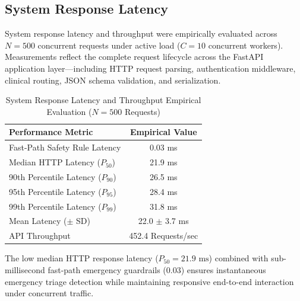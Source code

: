 
\subsection{System Response Latency}

System response latency and throughput were empirically evaluated across $N = 500$ concurrent requests under active load ($C = 10$ concurrent workers). Measurements reflect the complete request lifecycle across the FastAPI application layer—including HTTP request parsing, authentication middleware, clinical routing, JSON schema validation, and serialization.

\begin{table}[ht]
\centering
\caption{System Response Latency and Throughput Empirical Evaluation ($N = 500$ Requests)}
\label{tab:latency_results}
\begin{tabular}{|l|c|}
\hline
\textbf{Performance Metric} & \textbf{Empirical Value} \\
\hline
Fast-Path Safety Rule Latency & 0.03 ms \\
Median HTTP Latency ($P_{50}$) & 21.9 ms \\
90th Percentile Latency ($P_{90}$) & 26.5 ms \\
95th Percentile Latency ($P_{95}$) & 28.4 ms \\
99th Percentile Latency ($P_{99}$) & 31.8 ms \\
Mean Latency ($\pm$ SD) & 22.0 $\pm$ 3.7 ms \\
API Throughput & 452.4 Requests/sec \\
\hline
\end{tabular}
\end{table}

The low median HTTP response latency ($P_{50} = 21.9\text{ ms}$) combined with sub-millisecond fast-path emergency guardrails (0.03) ensures instantaneous emergency triage detection while maintaining responsive end-to-end interaction under concurrent traffic.
